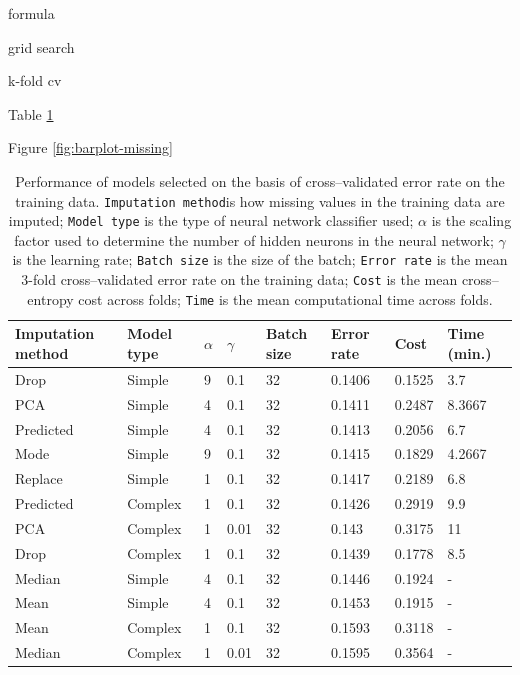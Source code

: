 \documentclass[10pt,twocolumn,letterpaper]{article}
\begin{document}
formula 

grid search 

k-fold cv

Table \ref{tab:err-rates}

Figure \ref{fig:barplot-missing}

\begin{table}[htbp]
\begin{center}
\begin{tabular}{llllllll}
\textbf{Imputation method} & \textbf{Model type} & \textbf{$\alpha$} & \textbf{$\gamma$} & \textbf{Batch size} & \textbf{Error rate} & \textbf{Cost} & \textbf{Time (min.)} \\
\hline
Drop & Simple & 9 & 0.1 & 32 & 0.1406 & 0.1525 & 3.7 \\
PCA & Simple & 4 & 0.1 & 32 & 0.1411 & 0.2487 & 8.3667 \\
Predicted & Simple & 4 & 0.1 & 32 & 0.1413 & 0.2056 & 6.7 \\
Mode & Simple & 9 & 0.1 & 32 & 0.1415 & 0.1829 & 4.2667 \\
Replace & Simple & 1 & 0.1 & 32 & 0.1417 & 0.2189 & 6.8 \\
Predicted & Complex & 1 & 0.1 & 32 & 0.1426 & 0.2919 & 9.9 \\
PCA & Complex & 1 & 0.01 & 32 & 0.143 & 0.3175 & 11 \\
Drop & Complex & 1 & 0.1 & 32 & 0.1439 & 0.1778 & 8.5 \\
Median & Simple & 4 & 0.1 & 32 & 0.1446 & 0.1924 & - \\
Mean & Simple & 4 & 0.1 & 32 & 0.1453 & 0.1915 & - \\
Mean & Complex & 1 & 0.1 & 32 & 0.1593 & 0.3118 & - \\
Median & Complex & 1 & 0.01 & 32 & 0.1595 & 0.3564 & - \\
\hline
\end{tabular}
\end{center}
\caption{Performance of models selected on the basis of cross--validated error rate on the training data. \texttt{Imputation method}is how missing values in the training data are imputed; \texttt{Model type} is the type of neural network classifier used; \texttt{$\alpha$} is the scaling factor used to determine the number of hidden neurons in the neural network; \texttt{$\gamma$} is the learning rate; \texttt{Batch size} is the size of the batch; \texttt{Error rate} is the mean 3-fold cross--validated error rate on the training data;  \texttt{Cost} is the mean cross--entropy cost across folds; \texttt{Time} is the mean computational time across folds. }
\label{tab:err-rates}
\end{table}
\end{document}
